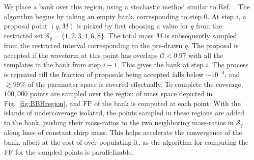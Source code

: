 \documentclass[aps,
prd,
twocolumn,
superscriptaddress,
lengthcheck,showpacs,letterpaper,nofootinbib,
floatfix]{revtex4-1}
\newcommand{\FF}{\mathrm{FF}}
\newcommand{\red}{\textcolor{red}}
\begin{document}
We place a bank over this region, using a stochastic method similar 
to Ref.~\citep{Harry:2009ea,Ajith:2012mn,Manca:2009xw}. 
The algorithm begins by taking an empty bank,
corresponding to step $0$. At step $i$, a proposal point $(q,M)$ is picked
by first choosing a value for $q$ from the restricted set
$\mathcal{S}_q=\{1,2,3,4,6,8\}$. The total mass $M$ is subsequently sampled
from the restricted interval corresponding to the pre-drawn $q$. The proposal 
is accepted if the waveform at this point has overlaps $\mathcal{O}< 0.97$ 
with all the templates in the bank from step $i-1$. This gives 
the bank at step $i$. The process is repeated till the fraction of 
proposals being accepted falls below $\sim 10^{-4}$, and $\gtrsim 99\%$
of the parameter space is covered effectually.
To complete the coverage, $100,000$ points are sampled over the region of mass
space depicted in Fig.~\ref{fig:BBHregion}, and $\FF$ of the bank
is computed at each point. With the islands of undercoverage isolated, the
points sampled in these regions are added to the bank, pushing their 
mass-ratios to the two neighboring mass-ratios in $\mathcal{S}_q$ 
along lines of constant chirp mass. 
This helps accelerate the convergence of the bank, albeit at the cost of 
over-populating it, as the algorithm for computing the $\FF$ for the 
sampled points is parallelizable.
\end{document}
